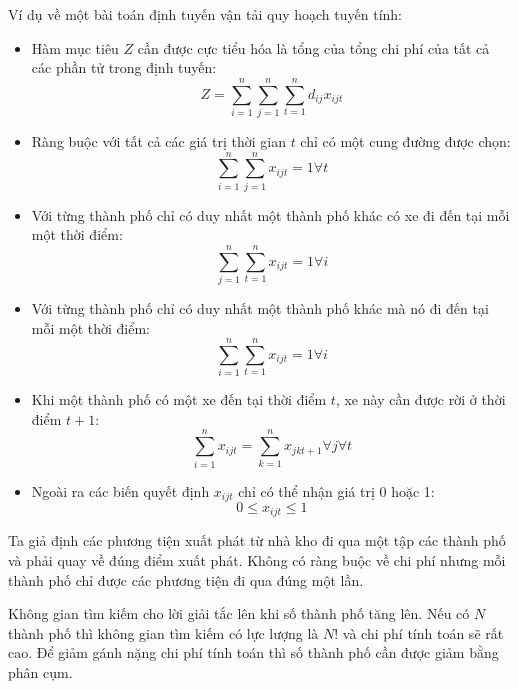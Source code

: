 \documentclass[14pt, a4paper]{article}
\numberwithin{equation}{section}
\numberwithin{figure}{section}
\numberwithin{dl}{section}
\numberwithin{md}{section}
\numberwithin{bd}{section}
\numberwithin{dn}{section}
\numberwithin{hq}{section}
\begin{document}
    Ví dụ về một bài toán định tuyến vận tải quy hoạch tuyến tính:

    \begin{itemize}
        \item Hàm mục tiêu $Z$ cần được cực tiểu hóa là tổng của tổng chi phí của tất cả các phần tử trong định tuyến:
        \begin{equation}
            Z = \sum_{i=1}^n \sum_{j=1}^n \sum_{t=1}^n d_{ij} x_{ijt}
        \end{equation}
        \item Ràng buộc với tất cả các giá trị thời gian $t$ chỉ có một cung đường được chọn:
        \begin{equation}
            \sum_{i=1}^n \sum_{j=1}^n x_{ijt} = 1 \forall t
        \end{equation}
        \item Với từng thành phố chỉ có duy nhất một thành phố khác có xe đi đến tại mỗi một thời điểm:
        \begin{equation}
            \sum_{j=1}^n \sum_{t=1}^n x_{i j t}=1 \forall i
        \end{equation}
        \item Với từng thành phố chỉ có duy nhất một thành phố khác mà nó đi đến tại mỗi một thời điểm:
        \begin{equation}
            \sum_{i=1}^n \sum_{t=1}^n x_{ijt}=1 \forall i
        \end{equation}
        \item Khi một thành phố có một xe đến tại thời điểm $t$, xe này cần được rời ở thời điểm $t+1$:
        \begin{equation}
            \sum_{i=1}^n x_{i j t} = \sum_{k=1}^n x_{j k t + 1} \forall j \forall t
        \end{equation}
        \item Ngoài ra các biến quyết định $x_{i j t}$ chỉ có thể nhận giá trị 0 hoặc 1:
        \begin{equation}
            0 \leq x_{i j t} \leq 1
        \end{equation}
    \end{itemize}

    Ta giả định các phương tiện xuất phát từ nhà kho đi qua một tập các thành phố và phải quay về đúng điểm xuất phát.
    Không có ràng buộc về chi phí nhưng mỗi thành phố chỉ được các phương tiện đi qua đúng một lần.

    Không gian tìm kiếm cho lời giải tắc lên khi số thành phố tăng lên.
    Nếu có $N$ thành phố thì không gian tìm kiếm có lực lượng là $N!$ và chi phí tính toán sẽ rất cao.
    Để giảm gánh nặng chi phí tính toán thì số thành phố cần được giảm bằng phân cụm.
\end{document}
